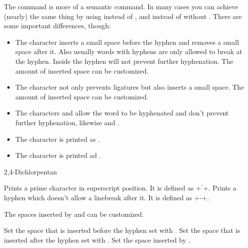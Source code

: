 \documentclass{chemmacros-manual}
\begin{document}
\begin{example}
  \begin{minipage}{.4\linewidth}
  \end{minipage}
\end{example}

The  command is more of a semantic command.  In many cases you can
achieve (nearly) the same thing by using \cs*{-} instead of \sym{\textbar},
and  instead of \sym{\textasciicircum} without
.  There are some important differences, though:
\begin{itemize}
  \item The character \sym{-} inserts a small space before the hyphen and
    removes a small space after it.  Also usually words with hyphens are only
    allowed to break at the hyphen.  Inside  the hyphen will not
    prevent further hyphenation.  The amount of inserted space can be
    customized.
  \item The character \sym{\textbar} not only prevents ligatures but also
    inserts a small space.  The amount of inserted space can be customized.
  \item The characters \sym{(} and \sym{)} allow the word to be hyphenated and
    don't prevent further hyphenation, likewise \sym{[} and \sym{]}.
  \item {}The character  is printed as .
  \item {}The character \sym{=} is printed ad
    .
\end{itemize}
\begin{example}
  \huge{} \par
  2,4-Dichlorpentan
\end{example}
\begin{commands}
    Prints a prime character in superscript position.  It is
    defined as \verbcode+\ensuremath{{}^{\prime}}+.
    Prints a hyphen which doesn't allow a linebreak after
    it.  It is defined as \verbcode+\mbox{-}\nobreak\hspace{0pt}+.
\end{commands}

The spaces inserted by \sym{-} and \sym{\textbar} can be
customized.
\begin{options}
  \Default{.01em}
    Set the space that is inserted before the hyphen set with \sym{-}.
  \Default{-.03em}
    Set the space that is inserted after the hyphen set with \sym{-}.
  \Default{.01em}
    Set the space inserted by \sym{\textbar}.
\end{options}
\end{document}
